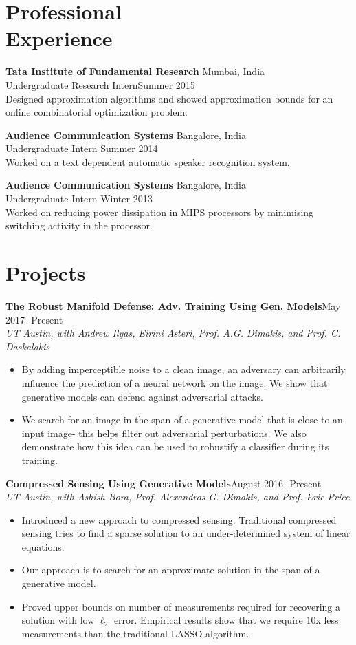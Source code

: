 \documentclass[margin, 11pt]{res} %
\begin{document}
\begin{resume}
\section{\large Professional \\ Experience} 
{\bf Tata Institute of Fundamental Research} \hfill Mumbai, India\\
Undergraduate Research Intern\hfill Summer 2015\\
Designed approximation algorithms and showed approximation bounds for an online combinatorial optimization problem.

{\bf Audience Communication Systems} \hfill Bangalore, India\\
Undergraduate Intern \hfill Summer 2014\\
Worked on a text dependent automatic speaker recognition system.

{\bf Audience Communication Systems} \hfill Bangalore, India\\
Undergraduate Intern \hfill Winter 2013\\
Worked on reducing power dissipation in MIPS processors by minimising switching activity
in the processor.

\section{\large Projects}
{\bf The Robust Manifold Defense: Adv. Training Using Gen. Models}\hfill May 2017- Present\\
{\sl UT Austin, with Andrew Ilyas, Eirini Asteri, Prof. A.G. Dimakis, and Prof. C. Daskalakis}
\begin{itemize}\itemsep -2pt
	\item By adding imperceptible noise to a clean image, an adversary can arbitrarily influence the prediction of a neural network on the image. We show that generative models can defend against adversarial attacks.
	\item We search for an image in the span of a generative model that is close to an input image- this helps filter out adversarial perturbations. We also demonstrate how this idea can be used to robustify a classifier during its training.
\end{itemize}

{\bf Compressed Sensing Using Generative Models}\hfill August 2016- Present\\
{\sl UT Austin, with Ashish Bora, Prof. Alexandros G. Dimakis, and Prof. Eric Price}
\begin{itemize}\itemsep -2pt
	\item Introduced a new approach to compressed sensing. Traditional compressed sensing tries to find a sparse solution to an under-determined system of linear equations.
	\item Our approach is to search for an approximate solution in the span of a generative model.
	\item Proved upper bounds on number of measurements required for recovering a solution with low $\ell_2$ error. Empirical results show that we require $10$x less measurements than the traditional LASSO algorithm.
\end{itemize}


\end{resume}
\end{document}

